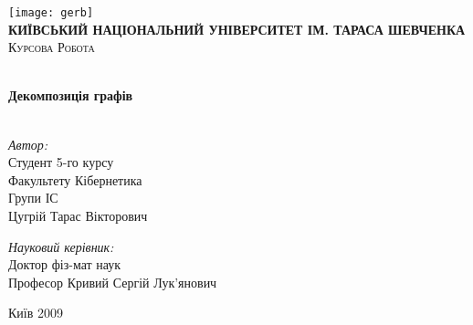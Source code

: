 \begin{titlepage}
  \begin{center}
    
    \texttt{[image: gerb]}\\[1cm]
    
    \textsc{\LARGE \bfseries \MakeUppercase{Київський національний університет ім. Тараса Шевченка}}\\[1.5cm]
    \textsc{\Large Курсова Робота}

    \HRule \\[0.4cm]
           { \huge \bfseries Декомпозиція графів}\\[0.4cm]
           
           \HRule \\[1.5cm]
           
           \begin{minipage}{0.45\textwidth}
             \begin{flushleft} \large
               \emph{Автор:}\\
               Студент 5-го курсу\\
               Факультету Кібернетика\\
               Групи ІС\\
               {Ц}угрій {Т}арас {В}ікторович 
             \end{flushleft}
           \end{minipage}
           \begin{minipage}{0.5\textwidth}
             \begin{flushright} \large
               \emph{Науковий керівник:}\\
               Доктор фіз-мат наук\\
               Професор {К}ривий {С}ергій {Л}ук'янович
             \end{flushright}
           \end{minipage}
           
           \vfill
           
           {\large Київ 2009}
           
  \end{center}
  
\end{titlepage}
